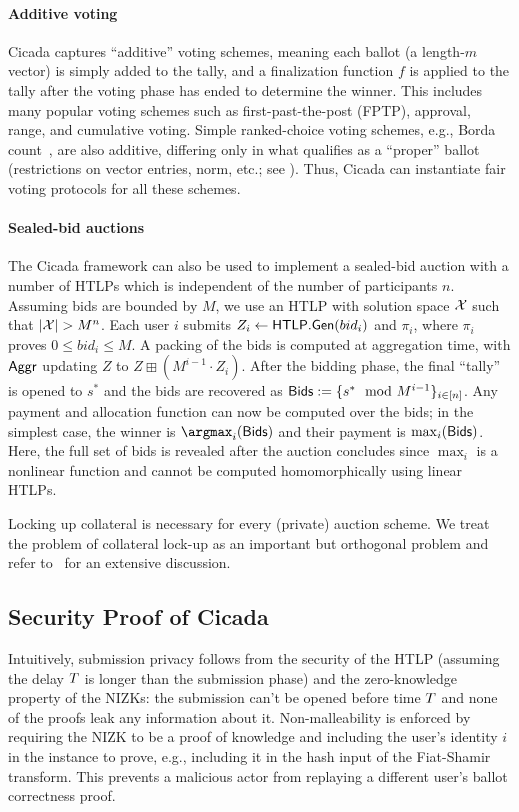 

\paragraph{Additive voting}
Cicada captures ``additive'' voting schemes, meaning each ballot (a length-$m$ vector) is simply added to the tally, and a finalization function $f$ is applied to the tally after the voting phase has ended to determine the winner. 
This includes many popular voting schemes such as first-past-the-post (FPTP), approval, range, and cumulative voting. Simple ranked-choice voting schemes, e.g., Borda count~\cite{Emerson13}, are also additive, differing only in what qualifies as a ``proper'' ballot (restrictions on vector entries, norm, etc.; see ). 
Thus, Cicada can instantiate fair voting protocols for all these schemes.

\paragraph{Sealed-bid auctions}
The Cicada framework can also be used to implement a sealed-bid auction with a number of HTLPs which is independent of the number of participants $n$. 
Assuming bids are bounded by $M$, we use an HTLP with solution space $\mathcal{X}$ such that $\lvert \mathcal{X} \rvert > M^n$.
Each user $i$ submits $Z_i \gets \mathsf{HTLP}.{\sf Gen}({bid}_i)$ and $\pi_i$, where $\pi_i$ proves $0 \leq {bid}_i \leq M$. A packing of the bids is computed at aggregation time, with $\mathsf{Aggr}$ updating $Z$ to $Z \boxplus (M^{i-1} \cdot Z_i)$. After the bidding phase, the final ``tally'' is opened to $s^*$ and the bids are recovered as ${\sf Bids} := \{ s^* \mod{M^{i-1}} \}_{i \in [n]}$. Any payment and allocation function can now be computed over the bids; in the simplest case, the winner is $\argmax_i ({\sf Bids})$ and their payment is $\max_i ({\sf Bids})$. Here, the full set of bids is revealed after the auction concludes since $\max_i$ is a nonlinear function and cannot be computed homomorphically using linear HTLPs.

Locking up collateral is necessary for every (private) auction scheme. We treat the problem of collateral lock-up as an important but orthogonal problem and refer to~\cite{CCS:TAFWBM23} for an extensive discussion.

\subsection{Security Proof of Cicada}
Intuitively, submission privacy follows from the security of the HTLP (assuming the delay $T$ is longer than the submission phase) and the zero-knowledge property of the NIZKs: the submission can't be opened before time $T$ and none of the proofs leak any information about it. Non-malleability is enforced by requiring the NIZK to be a proof of knowledge and including the user's identity $i$ in the instance to prove, e.g., including it in the hash input of the Fiat-Shamir transform. This prevents a malicious actor from replaying a different user's ballot correctness proof.

